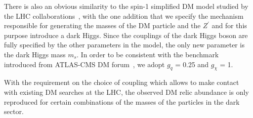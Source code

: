 There is also an obvious similarity to the spin-1 simplified DM model studied by the
LHC collaborations~\cite{Kahlhoefer2016}, with the one addition that we specify the mechanism
responsible for generating the masses of the DM particle and the $Z^{\prime}$ and for this purpose
introduce a dark Higgs. Since the couplings of the dark Higgs boson are fully specified
by the other parameters in the model, the only new parameter is the dark Higgs mass $m_{s}$. In order to be consistent with the benchmark introduced from ATLAS-CMS DM forum~\cite{Abercrombie:2015wmb}, we adopt $g_{q}$ = 0.25 and $g_{\chi}$ = 1.

With the requirement on the choice of coupling which allows to make contact with existing DM searches at the LHC, the observed DM relic abundance is only reproduced for certain combinations of the masses of the particles in the dark sector.




